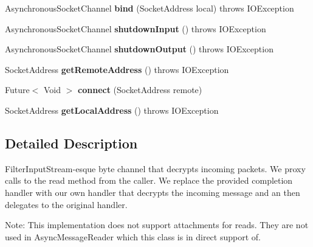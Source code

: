 \begin{DoxyCompactItemize}
Asynchronous\+Socket\+Channel {\bfseries bind} (Socket\+Address local)  throws I\+O\+Exception 
\item 
\mbox{\label{classcom_1_1mysql_1_1cj_1_1protocol_1_1_tls_asynchronous_socket_channel_a92a7d0396c75539e42e89868e88626eb}} 
Asynchronous\+Socket\+Channel {\bfseries shutdown\+Input} ()  throws I\+O\+Exception 
\item 
\mbox{\label{classcom_1_1mysql_1_1cj_1_1protocol_1_1_tls_asynchronous_socket_channel_aa101773740e726242024d8642c12cecf}} 
Asynchronous\+Socket\+Channel {\bfseries shutdown\+Output} ()  throws I\+O\+Exception 
\item 
\mbox{\label{classcom_1_1mysql_1_1cj_1_1protocol_1_1_tls_asynchronous_socket_channel_ad458628a47ddb262e5efcda1de49b4bf}} 
Socket\+Address {\bfseries get\+Remote\+Address} ()  throws I\+O\+Exception 
\item 
\mbox{\label{classcom_1_1mysql_1_1cj_1_1protocol_1_1_tls_asynchronous_socket_channel_a07a1023446082150144586cbc90bde66}} 
Future$<$ Void $>$ {\bfseries connect} (Socket\+Address remote)
\item 
\mbox{\label{classcom_1_1mysql_1_1cj_1_1protocol_1_1_tls_asynchronous_socket_channel_a74341ff74719b5c1c38fc5391ce53082}} 
Socket\+Address {\bfseries get\+Local\+Address} ()  throws I\+O\+Exception 
\end{DoxyCompactItemize}


\subsection{Detailed Description}
Filter\+Input\+Stream-\/esque byte channel that decrypts incoming packets. We proxy calls to the read method from the caller. We replace the provided completion handler with our own handler that decrypts the incoming message and an then delegates to the original handler.

Note\+: This implementation does not support attachments for reads. They are not used in Async\+Message\+Reader which this class is in direct support of. 

